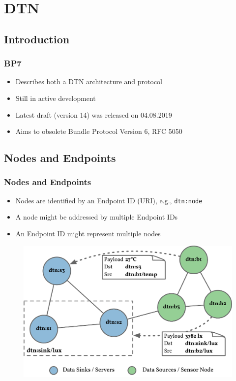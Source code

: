 \section{\acf{DTN}}

\subsection{Introduction}

\begin{frame}
  \frametitle{\acf{BP7}}

  \begin{itemize}
  \item Describes both a \acs{DTN} architecture and protocol
  \item Still in active development
  \item Latest draft (version 14) was released on 04.08.2019
  \item Aims to obsolete Bundle Protocol Version 6, RFC 5050
  \end{itemize}
\end{frame}

\subsection{Nodes and Endpoints}

\begin{frame}
  \frametitle{Nodes and Endpoints}

  \begin{itemize}
  \item Nodes are identified by an Endpoint ID (URI), e.g., \texttt{dtn:node}
  \item A node might be addressed by multiple Endpoint IDs
  \item An Endpoint ID might represent multiple nodes
  \end{itemize}

  \begin{figure}
    \includegraphics[width=0.6\linewidth,keepaspectratio]{include/nodes-endpoints}
  \end{figure}
\end{frame}

